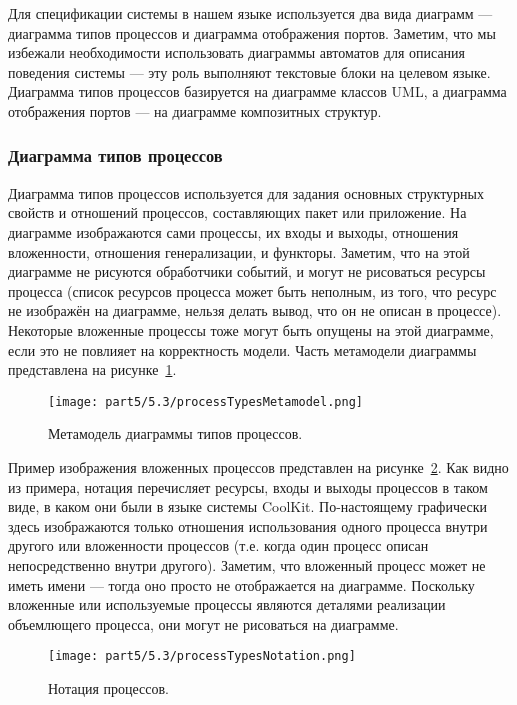 Для спецификации системы в нашем языке используется два вида диаграмм --- диаграмма 
типов процессов и диаграмма отображения портов. Заметим, что мы избежали необходимости 
использовать диаграммы автоматов для описания поведения системы --- эту роль выполняют 
текстовые блоки на целевом языке. Диаграмма типов процессов базируется на диаграмме 
классов UML, а диаграмма отображения портов --- на диаграмме композитных структур.

\subsubsection{Диаграмма типов процессов}
Диаграмма типов процессов используется для задания основных структурных свойств и 
отношений процессов, составляющих пакет или приложение. На диаграмме изображаются сами 
процессы, их входы и выходы, отношения вложенности, отношения генерализации, и функторы. 
Заметим, что на этой диаграмме не рисуются обработчики событий, и могут не рисоваться 
ресурсы процесса (список ресурсов процесса может быть неполным, из того, что ресурс 
не изображён на диаграмме, нельзя делать вывод, что он не описан в процессе). Некоторые 
вложенные процессы тоже могут быть опущены на этой диаграмме, если это не повлияет 
на корректность модели. Часть метамодели диаграммы представлена на рисунке~\ref{image:processTypesMetamodel}.

\begin{figure} [ht]
	\begin{center}
		\texttt{[image: part5/5.3/processTypesMetamodel.png]}
		\caption{Метамодель диаграммы типов процессов.}
		\label{image:processTypesMetamodel}
	\end{center}
\end{figure}

Пример изображения вложенных процессов представлен на рисунке~\ref{image:processTypesNotation}. 
Как видно из примера, нотация перечисляет ресурсы, входы и выходы процессов в таком 
виде, в каком они были в языке системы CoolKit. По-настоящему графически здесь изображаются 
только отношения использования одного процесса внутри другого или вложенности процессов 
(т.е. когда один процесс описан непосредственно внутри другого). Заметим, что вложенный 
процесс может не иметь имени --- тогда оно просто не отображается на диаграмме. Поскольку 
вложенные или используемые процессы являются деталями реализации объемлющего процесса, 
они могут не рисоваться на диаграмме. 

\begin{figure} [ht]
	\begin{center}
		\texttt{[image: part5/5.3/processTypesNotation.png]}
		\caption{Нотация процессов.}
		\label{image:processTypesNotation}
	\end{center}
\end{figure}


